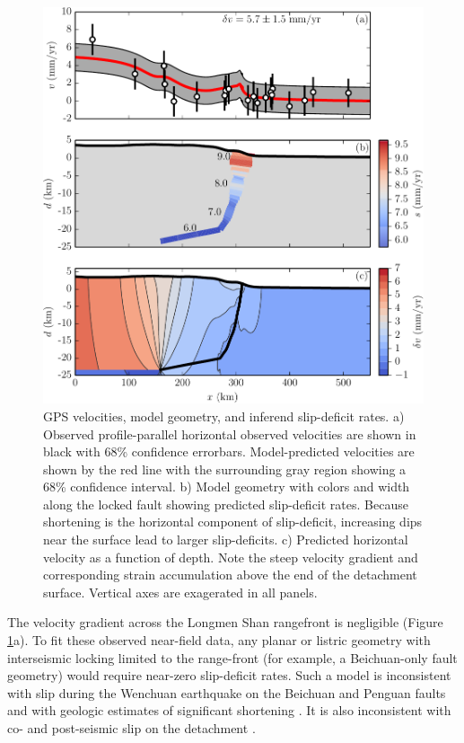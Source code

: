 \documentclass[12pt]{article}
\begin{document}
\begin{figure}[h!]
    \centering
    \includegraphics{figs/stack_figure_all_details.pdf}
    \caption{GPS velocities, model geometry, and inferend slip-deficit rates. a) Observed profile-parallel horizontal observed velocities are shown in black with 68\% confidence errorbars. Model-predicted velocities are shown by the red line with the surrounding gray region showing a 68\% confidence interval. b) Model geometry with colors and width along the locked fault showing predicted slip-deficit rates. Because shortening is the horizontal component of slip-deficit, increasing dips near the surface lead to larger slip-deficits. c) Predicted horizontal velocity as a function of depth. Note the steep velocity gradient and corresponding strain accumulation above the end of the detachment surface. Vertical axes are exagerated in all panels.}
    \label{fig:big_stack}
\end{figure}

The velocity gradient across the Longmen Shan rangefront is negligible (Figure \ref{fig:big_stack}a). To fit these observed near-field data, any planar or listric geometry with interseismic locking limited to the range-front (for example, a Beichuan-only fault geometry) would require near-zero slip-deficit rates. Such a model is inconsistent with slip during the Wenchuan earthquake on the Beichuan and Penguan faults and with geologic estimates of significant shortening \citep{Hubbard2010, Li2010a, Wang2013, Wang2014}. It is also inconsistent with co- and post-seismic slip on the detachment \citep{Qi2011, Fielding2013b}.
\end{document}
